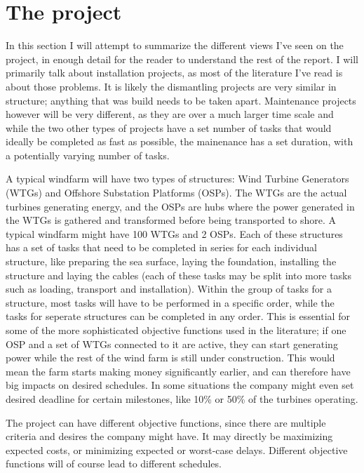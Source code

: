 \documentclass[a4paper,12pt]{article}
\begin{document}
\section{The project} \label{s:project}
In this section I will attempt to summarize the different views I've seen on the project, in enough detail for the reader to understand the rest of the report. I will primarily talk about installation projects, as most of the literature I've read is about those problems. It is likely the dismantling projects are very similar in structure; anything that was build needs to be taken apart. Maintenance projects however will be very different, as they are over a much larger time scale and while the two other types of projects have a set number of tasks that would ideally be completed as fast as possible, the mainenance has a set duration, with a potentially varying number of tasks.

A typical windfarm will have two types of structures: Wind Turbine Generators (WTGs) and Offshore Substation Platforms (OSPs). The WTGs are the actual turbines generating energy, and the OSPs are hubs where the power generated in the WTGs is gathered and transformed before being transported to shore. A typical windfarm might have 100 WTGs and 2 OSPs. Each of these structures has a set of tasks that need to be completed in series for each individual structure, like preparing the sea surface, laying the foundation, installing the structure and laying the cables (each of these tasks may be split into more tasks such as loading, transport and installation). Within the group of tasks for a structure, most tasks will have to be performed in a specific order, while the tasks for seperate structures can be completed in any order. This is essential for some of the more sophisticated objective functions used in the literature; if one OSP and a set of WTGs connected to it are active, they can start generating power while the rest of the wind farm is still under construction. This would mean the farm starts making money significantly earlier, and can therefore have big impacts on desired schedules. In some situations the company might even set desired deadline for certain milestones, like 10\% or 50\% of the turbines operating. 

The project can have different objective functions, since there are multiple criteria and desires the company might have. It may directly be maximizing expected costs, or minimizing expected or worst-case delays. Different objective functions will of course lead to different schedules. 
\end{document}
